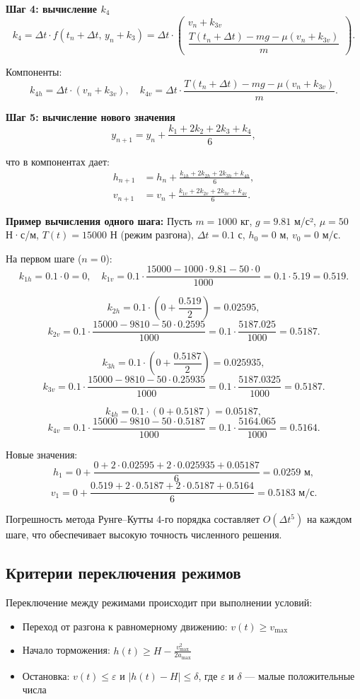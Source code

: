 \documentclass[a4paper, 14pt]{extarticle}
\begin{document}
\textbf{Шаг 4: вычисление $k_4$}
\[
k_4 = \Delta t \cdot f(t_n+\Delta t,\, y_n+k_3) = \Delta t \cdot \begin{pmatrix} v_n + k_{3v} \\ \dfrac{T(t_n+\Delta t) - mg - \mu(v_n + k_{3v})}{m} \end{pmatrix}.
\]

Компоненты:
\[
k_{4h} = \Delta t \cdot (v_n + k_{3v}), \quad k_{4v} = \Delta t \cdot \frac{T(t_n+\Delta t) - mg - \mu(v_n + k_{3v})}{m}.
\]

\textbf{Шаг 5: вычисление нового значения}
\[
y_{n+1} = y_n + \frac{k_1 + 2k_2 + 2k_3 + k_4}{6},
\]

что в компонентах дает:
\[
\begin{aligned}
h_{n+1} &= h_n + \frac{k_{1h} + 2k_{2h} + 2k_{3h} + k_{4h}}{6},\\
v_{n+1} &= v_n + \frac{k_{1v} + 2k_{2v} + 2k_{3v} + k_{4v}}{6}.
\end{aligned}
\]

\textbf{Пример вычисления одного шага:}
Пусть $m = 1000$ кг, $g = 9.81$ м/с², $\mu = 50$ Н·с/м, $T(t) = 15000$ Н (режим разгона), $\Delta t = 0.1$ с, $h_0 = 0$ м, $v_0 = 0$ м/с.

На первом шаге ($n = 0$):
\[
k_{1h} = 0.1 \cdot 0 = 0, \quad k_{1v} = 0.1 \cdot \frac{15000 - 1000 \cdot 9.81 - 50 \cdot 0}{1000} = 0.1 \cdot 5.19 = 0.519.
\]

\[
k_{2h} = 0.1 \cdot \left(0 + \frac{0.519}{2}\right) = 0.02595,
\]
\[
k_{2v} = 0.1 \cdot \frac{15000 - 9810 - 50 \cdot 0.2595}{1000} = 0.1 \cdot \frac{5187.025}{1000} = 0.5187.
\]

\[
k_{3h} = 0.1 \cdot \left(0 + \frac{0.5187}{2}\right) = 0.025935,
\]
\[
k_{3v} = 0.1 \cdot \frac{15000 - 9810 - 50 \cdot 0.25935}{1000} = 0.1 \cdot \frac{5187.0325}{1000} = 0.5187.
\]

\[
k_{4h} = 0.1 \cdot (0 + 0.5187) = 0.05187,
\]
\[
k_{4v} = 0.1 \cdot \frac{15000 - 9810 - 50 \cdot 0.5187}{1000} = 0.1 \cdot \frac{5164.065}{1000} = 0.5164.
\]

Новые значения:
\[
h_1 = 0 + \frac{0 + 2 \cdot 0.02595 + 2 \cdot 0.025935 + 0.05187}{6} = 0.0259 \text{ м},
\]
\[
v_1 = 0 + \frac{0.519 + 2 \cdot 0.5187 + 2 \cdot 0.5187 + 0.5164}{6} = 0.5183 \text{ м/с}.
\]

Погрешность метода Рунге--Кутты 4-го порядка составляет $O(\Delta t^5)$ на каждом шаге, что обеспечивает высокую точность численного решения.

\subsection{Критерии переключения режимов}
Переключение между режимами происходит при выполнении условий:
\begin{itemize}
  \item Переход от разгона к равномерному движению: $v(t) \ge v_{\max}$
  \item Начало торможения: $h(t) \ge H - \frac{v_{\max}^2}{2a_{\max}}$
  \item Остановка: $v(t) \le \varepsilon$ и $|h(t) - H| \le \delta$, где $\varepsilon$ и $\delta$ — малые положительные числа
\end{itemize}
\end{document}
